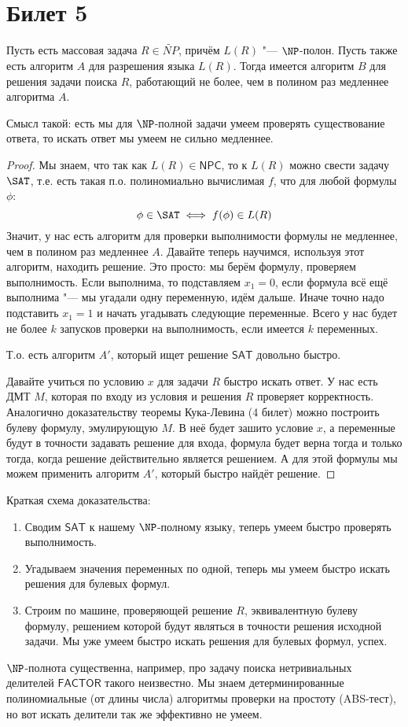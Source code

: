 \setcounter{section}{4}
\section{Билет 5}
	\begin{theorem}
		Пусть есть массовая задача $R \in \widetilde{NP}$, причём $L(R)$ "--- $\NP$-полон.
		Пусть также есть алгоритм $A$ для разрешения языка $L(R)$.
		Тогда имеется алгоритм $B$ для решения задачи поиска $R$, работающий не более, чем в полином раз медленнее алгоритма $A$.
	\end{theorem}
	\begin{Rem}
		Смысл такой: есть мы для $\NP$-полной задачи умеем проверять существование ответа, то искать ответ мы умеем не сильно медленнее.
	\end{Rem}
	\begin{proof}
		Мы знаем, что так как $L(R) \in \mathsf{NPC}$, то к $L(R)$ можно свести задачу $\SAT$,
		т.е. есть такая п.о. полиномиально вычислимая $f$, что для любой формулы $\phi$:
		\[ \phi \in \SAT \iff f(\phi) \in L(R) \]
		Значит, у нас есть алгоритм для проверки выполнимости формулы не медленнее, чем в полином раз медленнее $A$.
		Давайте теперь научимся, используя этот алгоритм, находить решение.
		Это просто: мы берём формулу, проверяем выполнимость.
		Если выполнима, то подставляем $x_1=0$, если формула всё ещё выполнима "--- мы угадали одну переменную, идём дальше.
		Иначе точно надо подставить $x_1=1$ и начать угадывать следующие переменные.
		Всего у нас будет не более $k$ запусков проверки на выполнимость, если имеется $k$ переменных.

		Т.о. есть алгоритм $A'$, который ищет решение $\mathsf{SAT}$ довольно быстро.

		Давайте учиться по условию $x$ для задачи $R$ быстро искать ответ.
		У нас есть ДМТ $M$, которая по входу из условия и решения $R$ проверяет корректность.
		Аналогично доказательству теоремы Кука-Левина (4 билет) можно построить булеву формулу, эмулирующую $M$.
		В неё будет зашито условие $x$, а переменные будут в точности задавать решение для входа, формула
		будет верна тогда и только тогда, когда решение действительно является решением.
		А для этой формулы мы можем применить алгоритм $A'$, который быстро найдёт решение.
	\end{proof}
	\begin{Rem}
		Краткая схема доказательства:
		\begin{enumerate}
			\item Сводим $\mathsf{SAT}$ к нашему $\NP$-полному языку, теперь умеем быстро проверять выполнимость.
			\item Угадываем значения переменных по одной, теперь мы умеем быстро искать решения для булевых формул.
			\item Строим по машине, проверяющей решение $R$, эквивалентную булеву формулу, решением которой будут являться в точности решения исходной задачи.
				Мы уже умеем быстро искать решения для булевых формул, успех.
		\end{enumerate}
	\end{Rem}
	\begin{Rem}
		$\NP$-полнота существенна, например, про задачу поиска нетривиальных делителей $\mathsf{FACTOR}$ такого неизвестно.
		Мы знаем детерминированные полиномиальные (от длины числа) алгоритмы проверки на простоту (ABS-тест), но вот искать делители так же эффективно не умеем.
	\end{Rem}
